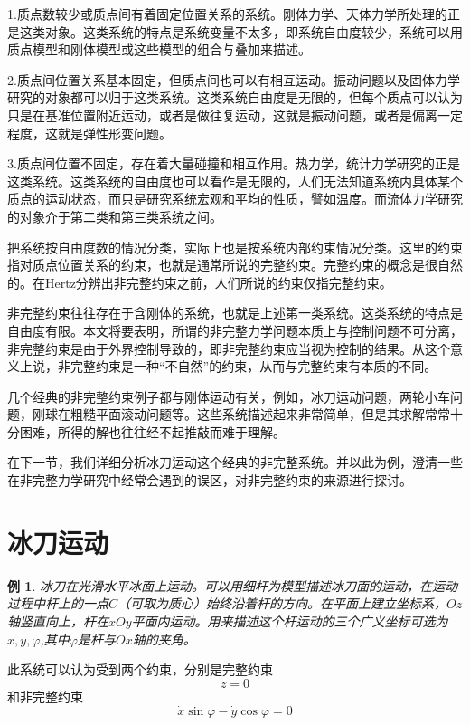 \documentclass{ctexart}
\begin{document}
1.质点数较少或质点间有着固定位置关系的系统。刚体力学、天体力学所处理的正是这类对象。这类系统的特点是系统变量不太多，即系统自由度较少，系统可以用质点模型和刚体模型或这些模型的组合与叠加来描述。

2.质点间位置关系基本固定，但质点间也可以有相互运动。振动问题以及固体力学研究的对象都可以归于这类系统。这类系统自由度是无限的，但每个质点可以认为只是在基准位置附近运动，或者是做往复运动，这就是振动问题，或者是偏离一定程度，这就是弹性形变问题。

3.质点间位置不固定，存在着大量碰撞和相互作用。热力学，统计力学研究的正是这类系统。这类系统的自由度也可以看作是无限的，人们无法知道系统内具体某个质点的运动状态，而只是研究系统宏观和平均的性质，譬如温度。而流体力学研究的对象介于第二类和第三类系统之间。


把系统按自由度数的情况分类，实际上也是按系统内部约束情况分类。这里的约束指对质点位置关系的约束，也就是通常所说的完整约束。完整约束的概念是很自然的。在Hertz分辨出非完整约束之前，人们所说的约束仅指完整约束。

非完整约束往往存在于含刚体的系统，也就是上述第一类系统。这类系统的特点是自由度有限。本文将要表明，所谓的非完整力学问题本质上与控制问题不可分离，非完整约束是由于外界控制导致的，即非完整约束应当视为控制的结果。从这个意义上说，非完整约束是一种“不自然”的约束，从而与完整约束有本质的不同。

几个经典的非完整约束例子都与刚体运动有关，例如，冰刀运动问题，两轮小车问题，刚球在粗糙平面滚动问题等。这些系统描述起来非常简单，但是其求解常常十分困难，所得的解也往往经不起推敲而难于理解。

在下一节，我们详细分析冰刀运动这个经典的非完整系统。并以此为例，澄清一些在非完整力学研究中经常会遇到的误区，对非完整约束的来源进行探讨。
\section{冰刀运动}
\label{sec:ice}
\newtheorem{example}{例}[section]

\begin{example}
  冰刀在光滑水平冰面上运动。可以用细杆为模型描述冰刀面的运动，在运动过程中杆上的一点$C$（可取为质心）始终沿着杆的方向。在平面上建立坐标系，$Oz$轴竖直向上，杆在$xOy$平面内运动。用来描述这个杆运动的三个广义坐标可选为$x,y,\varphi$,其中$\varphi$是杆与$Ox$轴的夹角。
\end{example}

此系统可以认为受到两个约束，分别是完整约束
\begin{equation}
  \label{eq:ice1}
  z = 0
\end{equation}
和非完整约束
\begin{equation}
  \label{eq:ice2}
  \dot{x} \sin\varphi - \dot{y} \cos\varphi = 0
\end{equation}
\end{document}
